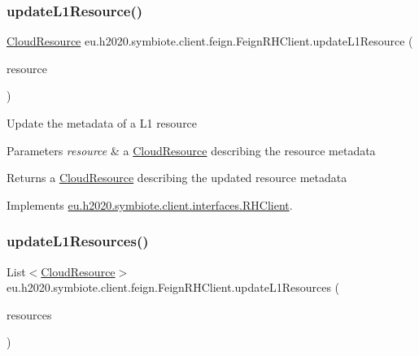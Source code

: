 \subsubsection{\texorpdfstring{update\+L1\+Resource()}{updateL1Resource()}}
{\footnotesize\ttfamily \hyperlink{classeu_1_1h2020_1_1symbiote_1_1cloud_1_1model_1_1internal_1_1CloudResource}{Cloud\+Resource} eu.\+h2020.\+symbiote.\+client.\+feign.\+Feign\+R\+H\+Client.\+update\+L1\+Resource (\begin{DoxyParamCaption}\item[{\hyperlink{classeu_1_1h2020_1_1symbiote_1_1cloud_1_1model_1_1internal_1_1CloudResource}{Cloud\+Resource}}]{resource }\end{DoxyParamCaption})}

Update the metadata of a L1 resource


\begin{DoxyParams}{Parameters}
{\em resource} & a \hyperlink{}{Cloud\+Resource} describing the resource metadata \\
\hline
\end{DoxyParams}
\begin{DoxyReturn}{Returns}
a \hyperlink{}{Cloud\+Resource} describing the updated resource metadata 
\end{DoxyReturn}


Implements \hyperlink{interfaceeu_1_1h2020_1_1symbiote_1_1client_1_1interfaces_1_1RHClient_a4428c0bb91f9433dae6a0ef98a696d11}{eu.\+h2020.\+symbiote.\+client.\+interfaces.\+R\+H\+Client}.

\mbox{\label{classeu_1_1h2020_1_1symbiote_1_1client_1_1feign_1_1FeignRHClient_ab915fafbde1cb56c856abac918cc9de4}} 
\subsubsection{\texorpdfstring{update\+L1\+Resources()}{updateL1Resources()}}
{\footnotesize\ttfamily List$<$\hyperlink{classeu_1_1h2020_1_1symbiote_1_1cloud_1_1model_1_1internal_1_1CloudResource}{Cloud\+Resource}$>$ eu.\+h2020.\+symbiote.\+client.\+feign.\+Feign\+R\+H\+Client.\+update\+L1\+Resources (\begin{DoxyParamCaption}\item[{List$<$ \hyperlink{classeu_1_1h2020_1_1symbiote_1_1cloud_1_1model_1_1internal_1_1CloudResource}{Cloud\+Resource} $>$}]{resources }\end{DoxyParamCaption})}

